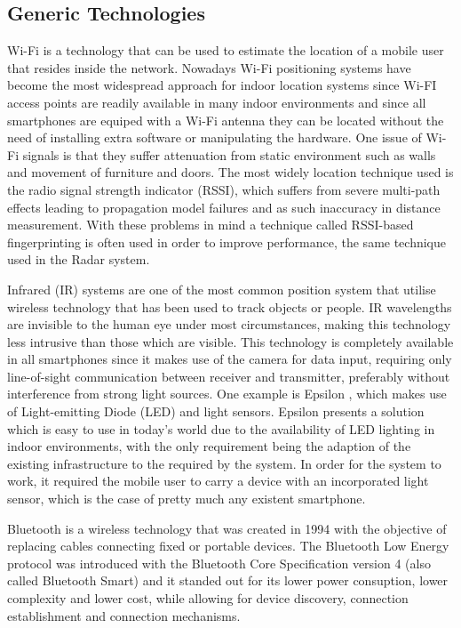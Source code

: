 \documentclass[a4paper]{IEEEtran}
\begin{document}
\subsection{Generic Technologies}
\label{subsec:gentech}

Wi-Fi is a technology that can be used to estimate the location of a mobile user that resides inside the network. Nowadays Wi-Fi positioning systems have become the most widespread approach for indoor location systems since Wi-FI access points are readily available in many indoor environments and since all smartphones are equiped with a Wi-Fi antenna they can be located without the need of installing extra software or manipulating the hardware. One issue of Wi-Fi signals is that they suffer attenuation from static environment such as walls and movement of furniture and doors. The most widely location technique used is the radio signal strength indicator (RSSI), which suffers from severe multi-path effects leading to propagation model failures and as such inaccuracy in distance measurement. With these problems in mind a technique called RSSI-based fingerprinting is often used in order to improve performance, the same technique used in the Radar system.

Infrared (IR) systems are one of the most common position system that utilise wireless technology that has been used to track objects or people. IR wavelengths are invisible to the human eye under most circumstances, making this technology less intrusive than those which are visible. This technology is completely available in all smartphones since it makes use of the camera for data input, requiring only line-of-sight communication between receiver and transmitter, preferably without interference from strong light sources. One example is Epsilon \cite{epsilon}, which makes use of Light-emitting Diode (LED) and light sensors. Epsilon presents a solution which is easy to use in today's world due to the availability of LED lighting in indoor environments, with the only requirement being the adaption of the existing infrastructure to the required by the system. In order for the system to work, it required the mobile user to carry a device with an incorporated light sensor, which is the case of pretty much any existent smartphone.

Bluetooth is a wireless technology that was created in 1994 with the objective of replacing cables connecting fixed or portable devices. The Bluetooth Low Energy protocol was introduced with the Bluetooth Core Specification version 4 (also called Bluetooth Smart) \cite{BLECore} and it standed out for its lower power consuption, lower complexity and lower cost, while allowing for  device discovery, connection establishment and connection mechanisms. 
\end{document}
